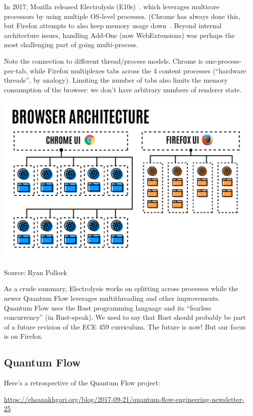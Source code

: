 \documentclass[a4paper]{report}
\begin{document}
In 2017, Mozilla released Electrolysis (E10s)~\cite{electrolysis}.
which leverages multicore processors by using multiple OS-level
processes. (Chrome has always done this, but Firefox attempts to also
keep memory usage
down~\cite{goldilocks}.
Beyond internal architecture issues, handling Add-Ons (now
WebExtensions) was perhaps the most challenging part of going
multi-process.

Note the connection to different thread/process models.
Chrome is one-process-per-tab, while Firefox multiplexes tabs across
the 4 content processes (``hardware threads'', by analogy). Limiting
the number of tabs also limits the memory consumption of the browser:
we don't have arbitrary numbers of renderer state.

\begin{center}
\includegraphics[width=.9\textwidth]{images/L19-chrome-vs-firefox.png}
\end{center}
Source: Ryan Pollock~\cite{goldilocks}

As a crude summary, Electrolysis works on splitting across processes
while the newer Quantum Flow leverages multithreading and other
improvements.  Quantum Flow uses the Rust programming language and its
``fearless concurrency'' (in Rust-speak). We used to say that Rust should probably be part of a future revision of the ECE 459 curriculum. The future is now! But our focus is on Firefox.

\subsection*{Quantum Flow}
Here's a retrospective of the Quantum Flow project:
\begin{center}
\url{https://ehsanakhgari.org/blog/2017-09-21/quantum-flow-engineering-newsletter-25}
\end{center}
\end{document}
